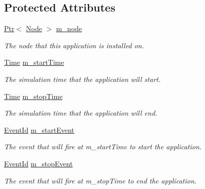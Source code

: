 \subsection*{Protected Attributes}
\begin{DoxyCompactItemize}
\item 
\hyperlink{classns3_1_1Ptr}{Ptr}$<$ \hyperlink{classns3_1_1Node}{Node} $>$ \hyperlink{classns3_1_1Application_af4ba01e31858d8446b4f077911db0019}{m\+\_\+node}
\begin{DoxyCompactList}\small\item\em The node that this application is installed on. \end{DoxyCompactList}\item 
\hyperlink{classns3_1_1Time}{Time} \hyperlink{classns3_1_1Application_a35d68c45777ef3123c9d5eb532e33f10}{m\+\_\+start\+Time}
\begin{DoxyCompactList}\small\item\em The simulation time that the application will start. \end{DoxyCompactList}\item 
\hyperlink{classns3_1_1Time}{Time} \hyperlink{classns3_1_1Application_a4c53bba994e27f37baaa718835da3e20}{m\+\_\+stop\+Time}
\begin{DoxyCompactList}\small\item\em The simulation time that the application will end. \end{DoxyCompactList}\item 
\hyperlink{classns3_1_1EventId}{Event\+Id} \hyperlink{classns3_1_1Application_a0fbd5a73ded085bb3a79634ec36c415a}{m\+\_\+start\+Event}
\begin{DoxyCompactList}\small\item\em The event that will fire at m\+\_\+start\+Time to start the application. \end{DoxyCompactList}\item 
\hyperlink{classns3_1_1EventId}{Event\+Id} \hyperlink{classns3_1_1Application_a95076e3ecffd2bfe16abeef13a1a4f76}{m\+\_\+stop\+Event}
\begin{DoxyCompactList}\small\item\em The event that will fire at m\+\_\+stop\+Time to end the application. \end{DoxyCompactList}\end{DoxyCompactItemize}
